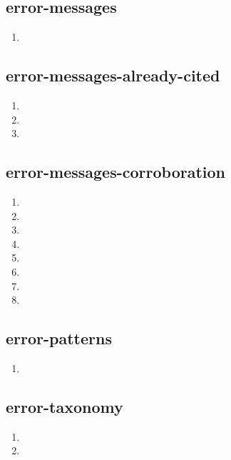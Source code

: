 \documentclass{article}
\begin{document}
\subsection{error-messages}
\begin{enumerate}
\item {}
\end{enumerate}

\subsection{error-messages-already-cited}
\begin{enumerate}
\item {}
\item {}
\item {}
\end{enumerate}

\subsection{error-messages-corroboration}
\begin{enumerate}
\item {}
\item {}
\item {}
\item {}
\item {}
\item {}
\item {}
\item {}
\end{enumerate}

\subsection{error-patterns}
\begin{enumerate}
\item {}
\end{enumerate}

\subsection{error-taxonomy}
\begin{enumerate}
\item {}
\item {}
\end{enumerate}
\end{document}
